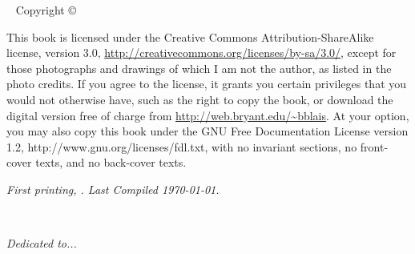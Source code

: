 
\newpage\thispagestyle{empty}


\newpage\thispagestyle{empty}
\vfill
{}
\vfill
{}
\vfill





\maketitle


\newpage
\begin{fullwidth}
~\vfill
\thispagestyle{empty}
\setlength{\parindent}{0pt}
\setlength{\parskip}{\baselineskip}
Copyright \copyright\ \the\year\ \thanklessauthor

\par{}

\par{}

\par     This book is licensed under the Creative Commons
    Attribution-ShareAlike license, version 3.0, 
    \url{http://creativecommons.org/licenses/by-sa/3.0/},
    except for those photographs and
    drawings of which I am not the author, as listed in the photo credits.
    If you agree to the license, it grants you certain privileges that
    you would not otherwise have, such as the right to copy the book,
    or download the digital version free of charge from
    \url{http://web.bryant.edu/~bblais}. At your option, you may also copy this book
    under the GNU Free Documentation License version 1.2, http://www.gnu.org/licenses/fdl.txt,
    with no invariant sections, no front-cover texts, and no back-cover texts.

\par\textit{First printing, \monthyear.  Last Compiled \today.}
\end{fullwidth}

\cleardoublepage
~\vfill
\begin{doublespace}
\noindent\fontsize{18}{22}\selectfont\itshape
\nohyphenation
Dedicated to...
\end{doublespace}
\thispagestyle{empty}
\vfill
\vfill

\cleardoublepage
%

\tableofcontents

\listoffigures


\cleardoublepage

